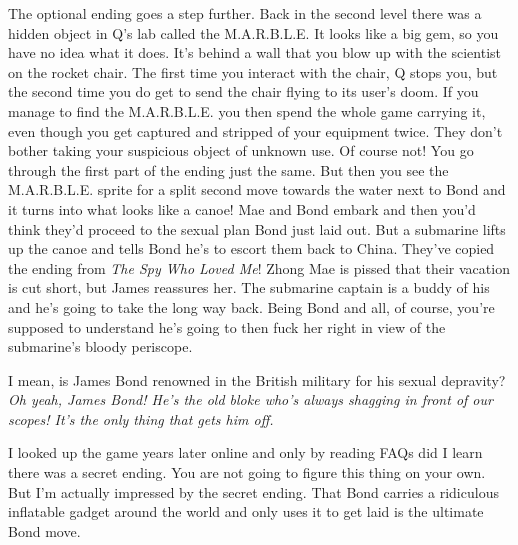 \documentclass{book}
\let\oldcenter\center
\let\oldendcenter\endcenter
\renewenvironment{center}{\setlength\topsep{0pt}\oldcenter}{\oldendcenter}
\begin{document}
The optional ending goes a step further. Back in the second level there was a hidden object in Q’s lab called the M.A.R.B.L.E. It looks like a big gem, so you have no idea what it does. It’s behind a wall that you blow up with the scientist on the rocket chair. The first time you interact with the chair, Q stops you, but the second time you do get to send the chair flying to its user’s doom. If you manage to find the M.A.R.B.L.E. you then spend the whole game carrying it, even though you get captured and stripped of your equipment twice. They don’t bother taking your suspicious object of unknown use. Of course not! You go through the first part of the ending just the same. But then you see the M.A.R.B.L.E. sprite for a split second move towards the water next to Bond and it turns into what looks like a canoe! Mae and Bond embark and then you’d think they’d proceed to the sexual plan Bond just laid out. But a submarine lifts up the canoe and tells Bond he’s to escort them back to China. They’ve copied the ending from \emph{The Spy Who Loved Me}! Zhong Mae is pissed that their vacation is cut short, but James reassures her. The submarine captain is a buddy of his and he’s going to take the long way back. Being Bond and all, of course, you’re supposed to understand he’s going to then fuck her right in view of the submarine’s bloody periscope.

\begin{center}
\quad\vspace{4pt}
\quad\vspace{4pt}
\quad\vspace{4pt}
\quad\vspace{4pt}
\quad\vspace{4pt}
\end{center}

I mean, is James Bond renowned in the British military for his sexual depravity? \emph{Oh yeah, James Bond! He’s the old bloke who’s always shagging in front of our scopes! It’s the only thing that gets him off.}

I looked up the game years later online and only by reading FAQs did I learn there was a secret ending. You are not going to figure this thing on your own. But I’m actually impressed by the secret ending. That Bond carries a ridiculous inflatable gadget around the world and only uses it to get laid is the ultimate Bond move.
\end{document}
